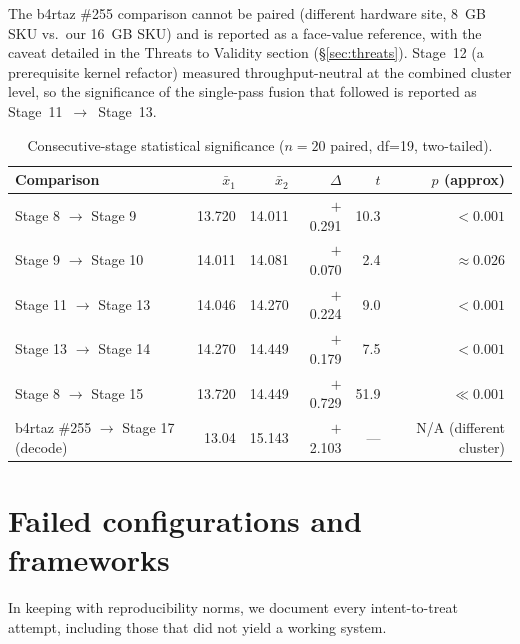 \documentclass[10pt,a4paper]{article}
\begin{document}
The b4rtaz \#255 comparison cannot be paired (different hardware site, 8~GB SKU vs.\ our 16~GB SKU) and is reported as a face-value reference, with the caveat detailed in the Threats to Validity section (\S\ref{sec:threats}). Stage~12 (a prerequisite kernel refactor) measured throughput-neutral at the combined cluster level, so the significance of the single-pass fusion that followed is reported as Stage~11~$\to$~Stage~13.

\begin{table}[H]
\centering
\small
\caption{Consecutive-stage statistical significance ($n=20$ paired, df=19, two-tailed).}
\label{tab:significance}
\begin{tabular}{lrrrrr}
\toprule
\textbf{Comparison}    & $\bar{x}_1$ & $\bar{x}_2$ & $\Delta$       & $t$    & $p$ (approx) \\
\midrule
Stage 8 $\to$ Stage 9  & 13.720      & 14.011      & $+$0.291       & 10.3   & $<0.001$ \\
Stage 9 $\to$ Stage 10 & 14.011      & 14.081      & $+$0.070       &  2.4   & $\approx 0.026$ \\
Stage 11 $\to$ Stage 13 & 14.046      & 14.270      & $+$0.224       &  9.0   & $<0.001$ \\
Stage 13 $\to$ Stage 14 & 14.270      & 14.449      & $+$0.179       &  7.5   & $<0.001$ \\
Stage 8 $\to$ Stage 15  & 13.720      & 14.449      & $+$0.729       & 51.9   & $\ll 0.001$ \\
b4rtaz \#255 $\to$ Stage 17 (decode) & 13.04   & 15.143      & $+$2.103       & ---    & N/A (different cluster) \\
\bottomrule
\end{tabular}
\end{table}

\section{Failed configurations and frameworks}

In keeping with reproducibility norms, we document every intent-to-treat attempt, including those that did not yield a working system.
\end{document}
